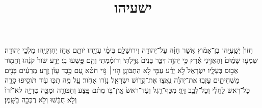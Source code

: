 \documentclass{openreader}
\title{ישעיהו}
\date{}
\begin{document}
\maketitle
\raggedbottom 
\fontsize{16pt}{24pt}\selectfont


חֲזֹון֙ יְשַֽׁעְיָ֣הוּ בֶן־אָמֹ֔וץ אֲשֶׁ֣ר חָזָ֔ה עַל־יְהוּדָ֖ה וִירוּשָׁלִָ֑ם בִּימֵ֨י עֻזִּיָּ֧הוּ יֹותָ֛ם אָחָ֥ז יְחִזְקִיָּ֖הוּ מַלְכֵ֥י יְהוּדָֽה׃ 
שִׁמְע֤וּ שָׁמַ֨יִם֙ וְהַאֲזִ֣ינִי אֶ֔רֶץ כִּ֥י יְהוָ֖ה דִּבֵּ֑ר בָּנִים֙ גִּדַּ֣לְתִּי וְרֹומַ֔מְתִּי וְהֵ֖ם פָּ֥שְׁעוּ בִֽי׃ 
יָדַ֥ע שֹׁור֙ קֹנֵ֔הוּ וַחֲמֹ֖ור אֵב֣וּס בְּעָלָ֑יו יִשְׂרָאֵל֙ לֹ֣א יָדַ֔ע עַמִּ֖י לֹ֥א הִתְבֹּונָֽן׃ 
הֹ֣וי׀ גֹּ֣וי חֹטֵ֗א עַ֚ם כֶּ֣בֶד עָוֹ֔ן זֶ֣רַע מְרֵעִ֔ים בָּנִ֖ים מַשְׁחִיתִ֑ים עָזְב֣וּ אֶת־יְהוָ֗ה נִֽאֲצ֛וּ אֶת־קְדֹ֥ושׁ יִשְׂרָאֵ֖ל נָזֹ֥רוּ אָחֹֽור׃ 
עַ֣ל מֶ֥ה תֻכּ֛וּ עֹ֖וד תֹּוסִ֣יפוּ סָרָ֑ה כָּל־רֹ֣אשׁ לָחֳלִ֔י וְכָל־לֵבָ֖ב דַּוָּֽי׃ 
מִכַּף־רֶ֤גֶל וְעַד־רֹאשׁ֙ אֵֽין־בֹּ֣ו מְתֹ֔ם פֶּ֥צַע וְחַבּוּרָ֖ה וּמַכָּ֣ה טְרִיָּ֑ה לֹא־זֹ֨רוּ֙ וְלֹ֣א חֻבָּ֔שׁוּ וְלֹ֥א רֻכְּכָ֖ה בַּשָּֽׁמֶן׃ 
\end{document}
